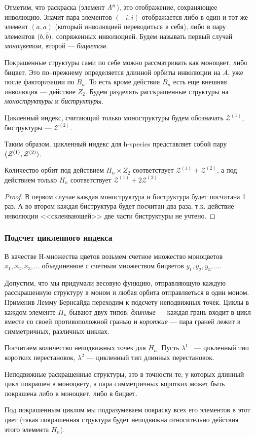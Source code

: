 Отметим, что раскраска (элемент $A^{\Bar n}$), это отображение,
сохраняющее инволюцию. Значит пара элементов $(-i, i)$
отображается либо в один и тот же элемент $(a, a)$ (который инволюцией
переводиться в себя), либо в пару элементов $(b, \Bar b)$, сопряженных
инволюцией. Будем называть первый случай \emph{моноцветом}, второй ---
\emph{бицветом}.

Покрашенные структуры сами по себе можно рассматривать как моноцвет, либо
бицвет. Это по--прежнему определяется длинной орбиты инволюции на $A$, уже
после факторизации по $B_n$. То есть кроме действия $B_n$ есть еще внешняя
инволюция --- действие $Z_2$. Будем разделять расскрашенные структуры на
\emph{моноструктуры} и \emph{биструктуры}.

Цикленный индекс, считающий только моноструктуры будем обозначать
$\mathcal Z^{(1)}$, биструктуры --- $\mathcal Z^{(2)}$. 
\begin{remark}
Таким образом, цикленный индекс для h-species представляет собой пару $(\mathcal Z^{(1)},
\mathcal Z^{(2)})$.
\end{remark}
\begin{statement}
Количество орбит под действием $H_n \times Z_2$ соответствует $\mathcal Z^{(1)}
+ \mathcal Z^{(2)}$, а под действием только $H_n$ соответствует $\mathcal Z^{(1)} + 2\mathcal
Z^{(2)}$. 
\end{statement}
\begin{proof}
В первом случае каждая моноструктура и биструктура будет посчитана 1 раз.
А во втором каждая биструктура будет посчитан два раза, т.к. действие инволюции
<<склеивающей>> две части биструктуры не учтено.
\end{proof}

\subsubsection{Подсчет цикленного индекса}
В качестве H-множества цветов возьмем счетное множество моноцветов $x_1, x_2,
x_3, \dots$ объединенное с счетным множеством бицветов $y_1, y_2, y_3, \dots$.

Допустим, что мы придумали весовую функцию, отправляющую каждую расскрашенную
структуру в моном и любая орбита отправляеться в один моном. Применив Лемму
Бернсайда переходим к подсчету неподвижных точек. Циклы в каждом элементе $H_n$
бывают двух типов:
\emph{длинные} --- каждая грань входит в цикл вместе со своей противоположной
гранью и \emph{короткие} --- пара граней лежит в симметричных, различных циклах. 

Посчитаем количество неподвижных точек для $H_n$. Пусть $\lambda^1$~
--- цикленный тип коротких перестановок, $\lambda^2$ --- цикленный тип длинных
перестановок. 
\begin{statement}
Неподвижные раскрашенные структуры, это в точности
те, у которых длинный цикл покрашен в моноцвету, а пара симметричных коротких 
может быть покрашена либо в моноцвет, либо в бицвет. 
\end{statement}
Под покрашенным циклом мы подразумеваем покраску всех его элементов в этот цвет
(такая покрашенная структура будет неподвижна относительно действия этого
элемента $H_n$).

